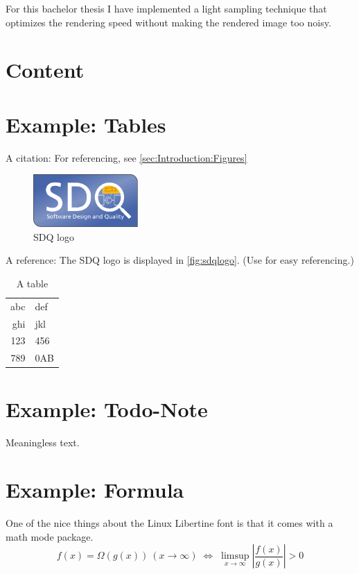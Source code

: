 For this bachelor thesis I have implemented a light sampling technique that optimizes the rendering speed without making the rendered image too noisy.

\section{Content}
\label{sec:Introduction:Content}


\section{Example: Tables}
\label{sec:Introduction:Tables}

A citation: \cite{becker2008a} For referencing, see \autoref{sec:Introduction:Figures}

\begin{figure}[h]
\centering
\includegraphics[width=4cm]{logos/sdqlogo}
\caption{SDQ logo}
\label{fig:sdqlogo}
\end{figure}

A reference: The SDQ logo is displayed in \autoref{fig:sdqlogo}. 
(Use  for easy referencing.) 

\begin{table}[h]
\centering
\begin{tabular}{r l}
\toprule
abc & def\\
ghi & jkl\\
\midrule
123 & 456\\
789 & 0AB\\
\bottomrule
\end{tabular}
\caption{A table}
\label{tab:atable}
\end{table}

\section{Example: Todo-Note}
Meaningless text.

\section{Example: Formula}
One of the nice things about the Linux Libertine font is that it comes with
a math mode package.
\begin{displaymath}
f(x)=\Omega(g(x))\ (x\rightarrow\infty)\;\Leftrightarrow\;
\limsup_{x \to \infty} \left|\frac{f(x)}{g(x)}\right|> 0
\end{displaymath}

